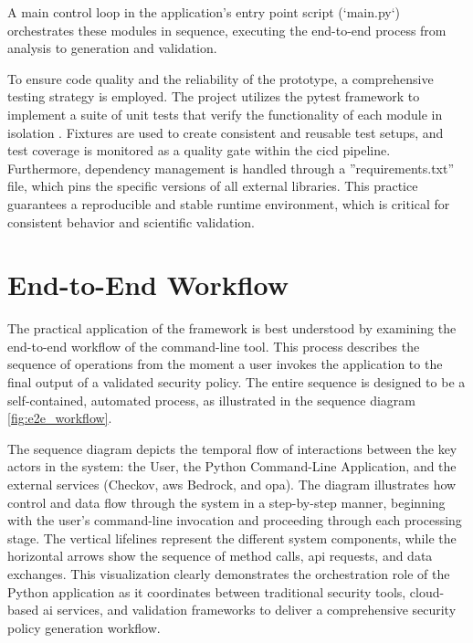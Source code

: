 A main control loop in the application's entry point script (`main.py`) orchestrates these modules in sequence, executing the end-to-end process from analysis to generation and validation.

To ensure code quality and the reliability of the prototype, a comprehensive testing strategy is employed. The project utilizes the pytest framework to implement a suite of unit tests that verify the functionality of each module in isolation \cite{noauthor_pytest_nodate}. Fixtures are used to create consistent and reusable test setups, and test coverage is monitored as a quality gate within the \gls{cicd} pipeline. Furthermore, dependency management is handled through a ''requirements.txt'' file, which pins the specific versions of all external libraries. This practice guarantees a reproducible and stable runtime environment, which is critical for consistent behavior and scientific validation.

\section{End-to-End Workflow}

The practical application of the framework is best understood by examining the end-to-end workflow of the command-line tool. This process describes the sequence of operations from the moment a user invokes the application to the final output of a validated security policy. The entire sequence is designed to be a self-contained, automated process, as illustrated in the sequence diagram \ref{fig:e2e_workflow}.

The sequence diagram depicts the temporal flow of interactions between the key actors in the system: the User, the Python Command-Line Application, and the external services (Checkov, \gls{aws} Bedrock, and \gls{opa}). The diagram illustrates how control and data flow through the system in a step-by-step manner, beginning with the user's command-line invocation and proceeding through each processing stage. The vertical lifelines represent the different system components, while the horizontal arrows show the sequence of method calls, \gls{api} requests, and data exchanges. This visualization clearly demonstrates the \gls{orchestration} role of the Python application as it coordinates between traditional security tools, cloud-based \gls{ai} services, and validation frameworks to deliver a comprehensive security policy generation workflow.

